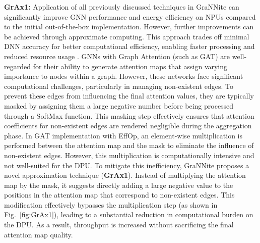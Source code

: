 \textbf{GrAx1:} Application of all previously discussed techniques in GraNNite can significantly improve GNN performance and energy efficiency on NPUs compared to the initial out-of-the-box implementation. However, further improvements can be achieved through approximate computing. This approach trades off minimal DNN accuracy for better computational efficiency, enabling faster processing and reduced resource usage \cite{axis_tecs, drax}.
GNNs with Graph Attention (such as GAT) are well-regarded for their ability to generate attention maps that assign varying importance to nodes within a graph. However, these networks face significant computational challenges, particularly in managing non-existent edges. To prevent these edges from influencing the final attention values, they are typically masked by assigning them a large negative number before being processed through a SoftMax function. This masking step effectively ensures that attention coefficients for non-existent edges are rendered negligible during the aggregation phase.
In GAT implementation with EffOp, an element-wise multiplication is performed between the attention map and the mask to eliminate the influence of non-existent edges. However, this multiplication is computationally intensive and not well-suited for the DPU.
To mitigate this inefficiency, GraNNite proposes a novel approximation technique (\textbf{GrAx1}). Instead of multiplying the attention map by the mask, it suggests directly adding a large negative value to the positions in the attention map that correspond to non-existent edges. This modification effectively bypasses the multiplication step (as shown in Fig.~\ref{fig:GrAx1}), leading to a substantial reduction in computational burden on the DPU. As a result, throughput is increased without sacrificing the final attention map quality. 


